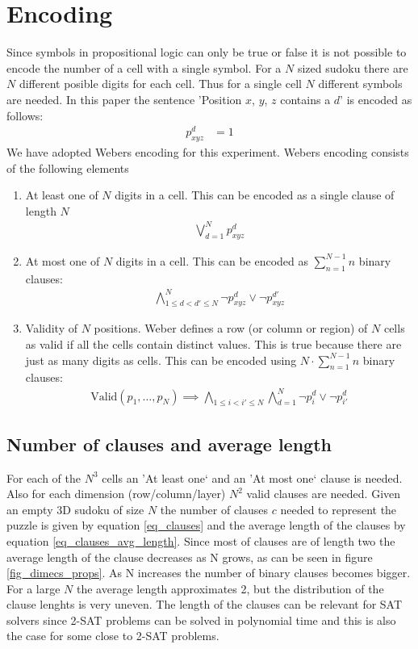 \section{Encoding}
Since symbols in propositional logic can only be true or false it is not possible to encode the number of a cell with a single symbol. For a $N$ sized sudoku there are $N$ different posible digits for each cell. Thus for a single cell $N$ different symbols are needed. In this paper the sentence 'Position $x$, $y$, $z$ contains a $d$' is encoded as follows:
\begin{align}
  p_{xyz}^d &= 1
\end{align}
We have adopted Webers \cite{weber2005sat} encoding for this experiment. Webers encoding consists of the following elements
\begin{enumerate}
  \item At least one of $N$ digits in a cell. This can be encoded as a single clause of length $N$
    \begin{align}
      \bigvee_{d=1}^N p_{xyz}^d
    \end{align}
  \item At most one of $N$ digits in a cell. This can be encoded as $\sum_{n=1}^{N-1}n$ binary clauses:
    \begin{align}
      \bigwedge_{1 \leq d < d' \leq N}^N \neg p_{xyz}^d \vee \neg p_{xyz}^{d'}
    \end{align}
  \item Validity of $N$ positions. Weber defines a row (or column or region) of $N$ cells as valid if all the cells contain distinct values. This is true because there are just as many digits as cells. This can be encoded using $N \cdot \sum_{n=1}^{N-1}n$ binary clauses:
    \begin{align}
      \text{Valid}(p_1,\dots,p_N) \implies \bigwedge_{1 \leq i < i' \leq N}\bigwedge_{d=1}^N \neg p_{i}^d \vee \neg p_{i'}^{d}
    \end{align}
\end{enumerate}

\subsection{Number of clauses and average length}
For each of the $N^3$ cells an 'At least one` and an 'At most one` clause is needed. Also for each dimension (row/column/layer) $N^2$ valid clauses are needed. Given an empty 3D sudoku of size $N$ the number of clauses $c$ needed to represent the puzzle is given by equation \ref{eq_clauses} and the average length of the clauses by equation \ref{eq_clauses_avg_length}. Since most of clauses are of length two the average length of the clause decreases as N grows, as can be seen in figure \ref{fig_dimecs_props}. As N increases the number of binary clauses becomes bigger. For a large $N$ the average length approximates 2, but the distribution of the clause lenghts is very uneven. The length of the clauses can be relevant for SAT solvers since 2-SAT problems can be solved in polynomial time and this is also the case for some close to 2-SAT problems.

